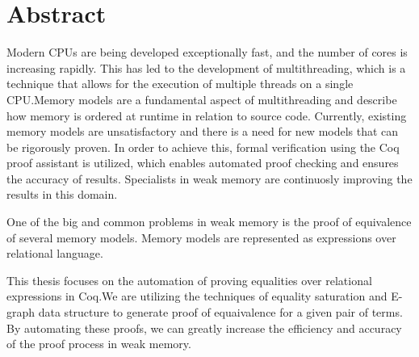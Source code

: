 \section*{Abstract}
Modern CPUs are being developed exceptionally fast, and the number of cores is increasing rapidly. This has led to the development of multithreading, which is a technique that allows for the execution of multiple threads on a single CPU.\@ Memory models are a fundamental aspect of multithreading and describe how memory is ordered at runtime in relation to source code. Currently, existing memory models are unsatisfactory and there is a need for new models that can be rigorously proven. In order to achieve this, formal verification using the Coq proof assistant is utilized, which enables automated proof checking and ensures the accuracy of results. Specialists in weak memory are continuosly improving the results in this domain.

One of the big and common problems in weak memory is the proof of equivalence of several memory models. Memory models are represented as expressions over relational language. 

This thesis focuses on the automation of proving equalities over relational expressions in Coq.\@ We are utilizing the techniques of equality saturation and E-graph data structure to generate proof of equaivalence for a given pair of terms. By automating these proofs, we can greatly increase the efficiency and accuracy of the proof process in weak memory.